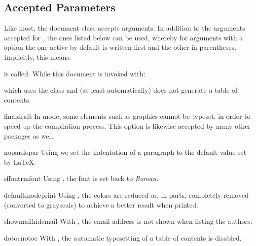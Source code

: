 \documentclass[useartcl,notoc]{sopra-paper}
\begin{document}
    \subsection{Accepted Parameters}
    Like most, the document class accepts arguments. In addition to
    the arguments accepted for , the ones listed below
    can be used, whereby for arguments with a  option
    the one active by default is written first and the other in parentheses.
    Implicitly, this means:
    is called. While this document is invoked with:
    which uses the  class and (at least automatically) does not generate a table of contents.

    \begin{argument}{final}{draft}
        In  mode, some elements such as graphics cannot
        be typeset, in order to speed up the compilation process.
        This option is likewise accepted by many other packages as well.
    \end{argument}

    \begin{argument}{nopar}{dopar}
        Using  we set the indentation of a paragraph
        to the default value set by \LaTeX.
    \end{argument}


    \begin{argument}{sffont}{rmfont}
        Using , the font is set back to \emph{Roman}.
    \end{argument}

    \begin{argument}{defaultmode}{print}
        Using , the colors are reduced or, in
        parts, completely removed (converted to grayscale) to achieve a better result
        when printed.
    \end{argument}

    \begin{argument}{showmail}{hidemail}
        With , the email address is not shown
        when listing the authors.
    \end{argument}

    \begin{argument}{dotoc}{notoc}
        With , the automatic typesetting of a table of contents is disabled.
    \end{argument}
\end{document}
